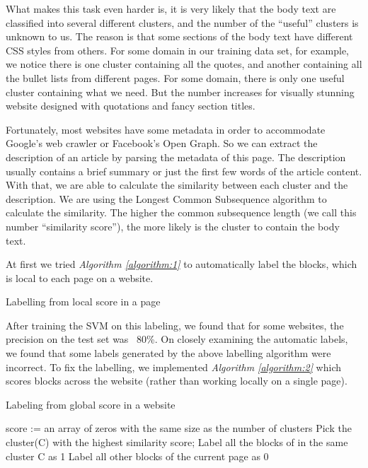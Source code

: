 \documentclass{acm_proc_article-sp}
\begin{document}
What makes this task even harder is, it is very likely that the body text are classified into several different clusters, and the number of the ``useful'' clusters is unknown to us. The reason is that some sections of the body text have different CSS styles from others. For some domain in our training data set, for example, we notice there is one cluster containing all the quotes, and another containing all the bullet lists from different pages. For some domain, there is only one useful cluster containing what we need. But the number increases for visually stunning website designed with quotations and fancy section titles.

Fortunately, most websites have some metadata in order to accommodate Google's web crawler or Facebook's Open Graph. So we can extract the description of an article by parsing the metadata of this page. The description usually contains a brief summary or just the first few words of the article content. With that, we are able to calculate the similarity between each cluster and the description. We are using the Longest Common Subsequence algorithm to calculate the similarity. The higher the common subsequence length (we call this number ``similarity score''), the more likely is the cluster to contain the body text.

At first we tried \emph{Algorithm \ref{algorithm:1}} to automatically label the blocks, which is local to each page on a website.

\begin{algorithm}
\label{algorithm:1}
 \SetLine
 \caption{Labelling from local score in a page}
\end{algorithm}

After training the SVM on this labeling, we found that for some websites, the precision on the test set was ~80\%. On closely examining the automatic labels, we found that some labels generated by the above labelling algorithm were incorrect. To fix the labelling, we implemented \emph{Algorithm \ref{algorithm:2}} which scores blocks across the website (rather than working locally on a single page).

\begin{algorithm}
\label{algorithm:2}
\caption{Labeling from global score in a website}

 \SetLine
 score := {an array of zeros with the same size as the number of clusters}
 Pick the cluster(C) with the highest similarity score;
 Label all the blocks of in the same cluster C as 1\;
 Label all other blocks of the current page as 0\;

\end{algorithm}
\end{document}
